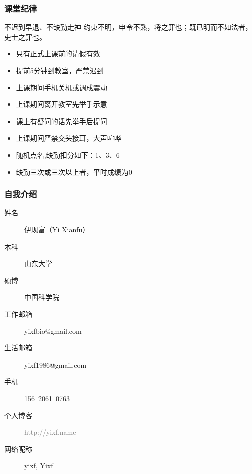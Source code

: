 \begin{frame}
  \frametitle{课堂纪律}
  \begin{alertblock}{不迟到早退、不缺勤走神}
  约束不明，申令不熟，将之罪也；既已明而不如法者，吏士之罪也。
  \end{alertblock}
  \pause
  \begin{itemize}[<+-|alert@+>]
    \item 只有正式上课前的请假有效
    \item 提前5分钟到教室，严禁迟到
    \item 上课期间手机关机或调成震动
    \item 上课期间离开教室先举手示意
    \item 课上有疑问的话先举手后提问
    \item 上课期间严禁交头接耳，大声喧哗
    \item 随机点名,缺勤扣分如下：1、3、6
    \item 缺勤三次或三次以上者，平时成绩为0
  \end{itemize}
\end{frame}

\begin{frame}
  \frametitle{自我介绍}
    \begin{description}
      \item[姓\qquad 名]伊现富（Yi Xianfu）
      \item[本\qquad 科]山东大学
      \item[硕\qquad 博]中国科学院
      \item[工作邮箱]\alert{yixfbio@gmail.com}
      \item[生活邮箱]yixf1986@gmail.com
      \item[手\qquad 机]156\ 2061\ 0763
      \item[个人博客]\textcolor{gray}{http://yixf.name}
      \item[网络昵称]yixf, Yixf
    \end{description}
\end{frame}


